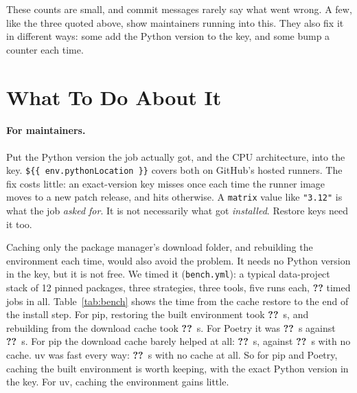 \documentclass[10pt,a4paper]{article}
\newcommand{\ck}[1]{\textbf{??}}\newcommand{\repourl}{\url{https://github.com/mark124/cache-key-soundness}}%
\begin{document}
These counts are small, and commit messages rarely say what went wrong. A few,
like the three quoted above, show maintainers running into this. They also
fix it in different ways: some add the Python version to the key, and some
bump a counter each time.

\section{What To Do About It}

\paragraph{For maintainers.} Put the Python version the job actually got, and
the CPU architecture, into the key. \texttt{\$\{\{ env.pythonLocation \}\}}
covers both on GitHub's hosted runners. The fix costs little: an exact-version
key misses once each time the runner image moves to a new patch release, and
hits otherwise. A \texttt{matrix} value like
\texttt{"3.12"} is what the job \emph{asked for}. It is not necessarily what got
\emph{installed}. Restore keys need it too.

Caching only the package manager's download folder, and rebuilding the
environment each time, would also avoid the problem. It needs no Python
version in the key, but it is not free. We timed it (\texttt{bench.yml}): a typical
data-project stack of 12 pinned packages, three strategies, three tools, five
runs each, \ck{t4.timed_jobs} timed jobs in all. Table~\ref{tab:bench} shows
the time from the cache restore to the end of the install step. For pip,
restoring the built environment took \ck{t4.pip_venv_median_s}~s, and rebuilding
from the download cache took \ck{t4.pip_download_median_s}~s. For Poetry it was
\ck{t4.poetry_venv_median_s}~s against \ck{t4.poetry_download_median_s}~s.
For pip the download cache barely helped at all:
\ck{t4.pip_download_median_s}~s, against \ck{t4.pip_none_median_s}~s with no
cache. uv
was fast every way: \ck{t4.uv_none_median_s}~s with no cache at all. So for pip
and Poetry, caching the built environment is worth keeping, with the exact
Python version in the key. For uv, caching the environment gains little.

\begin{table}[t]\centering\small
\caption{Seconds from cache restore to the end of the install step, five runs
per row. \emph{none}: no cache. \emph{download}: the package manager's download
folder is restored and the environment rebuilt. \emph{venv}: the built
environment is restored and the install step skipped. Produced by
\texttt{make table4} from \texttt{results/table4\_bench.csv}; every timed job
is in \texttt{results/table4\_bench\_raw.csv}.}
\label{tab:bench}
\end{table}
\end{document}
